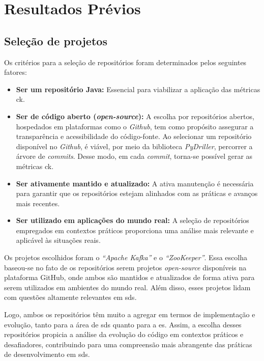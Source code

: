
\chapter{Resultados Prévios}
\label{cap:resultados}

\section{Seleção de projetos}

Os critérios para a seleção de repositórios foram determinados pelos seguintes fatores:

\begin{itemize}
    \item \textbf{Ser um repositório Java:} Essencial para viabilizar a aplicação das métricas \gls{ck}.
    \item \textbf{Ser de código aberto (\textit{open-source}):} A escolha por repositórios abertos, hospedados em plataformas como o \textit{Github}, tem como propósito assegurar a transparência e acessibilidade do código-fonte. Ao selecionar um repositório disponível no \textit{Github}, é viável, por meio da biblioteca \textit{PyDriller}, percorrer a árvore de \textit{commits}. Desse modo, em cada \textit{commit}, torna-se possível gerar as métricas \gls{ck}.
    \item \textbf{Ser ativamente mantido e atualizado:} A ativa manutenção é necessária para garantir que os repositórios estejam alinhados com as práticas e avanços mais recentes.
    \item \textbf{Ser utilizado em aplicações do mundo real:} A seleção de repositórios empregados em contextos práticos proporciona uma análise mais relevante e aplicável às situações reais.
\end{itemize}

Os projetos escolhidos foram o \textit{``Apache Kafka''}\cite{KafkaGitHub} e o \textit{``ZooKeeper''}\cite{ZookeeperGitHub}. Essa escolha baseou-se no fato de os repositórios serem projetos \textit{open-source} disponíveis na plataforma GitHub, onde ambos são mantidos e atualizados de forma ativa para serem utilizados em ambientes do mundo real. Além disso, esses projetos lidam com questões altamente relevantes em \gls{sds}.

Logo, ambos os repositórios têm muito a agregar em termos de implementação e evolução, tanto para a área de \gls{sds} quanto para a \gls{es}. Assim, a escolha desses repositórios propicia a análise da evolução do código em contextos práticos e desafiadores, contribuindo para uma compreensão mais abrangente das práticas de desenvolvimento em \gls{sds}.

